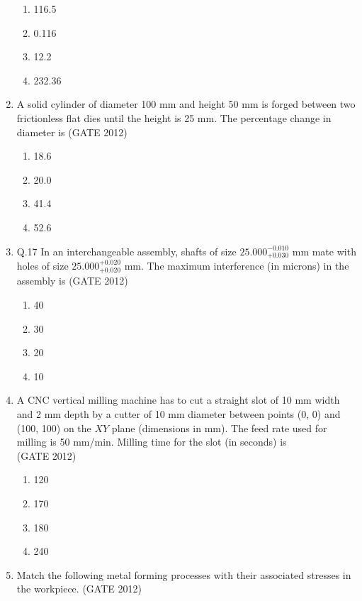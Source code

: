 \documentclass[journal,12pt,onecolumn]{IEEEtran}
\theoremstyle{remark}
\begin{document}
\begin{enumerate}
\begin{enumerate}
\item 116.5
\item 0.116
\item 12.2
\item 232.36
\end{enumerate}
\vspace{1cm}
\item  A solid cylinder of diameter 100 mm and height 50 mm is forged between two frictionless flat dies until the height is 25 mm. The percentage change in diameter is
\hfill{(GATE 2012)}

\begin{enumerate}
\item 18.6
\item 20.0
\item 41.4
\item 52.6
\end{enumerate}

\vspace{1cm}
\item Q.17 In an interchangeable assembly, shafts of size $25.000^{-0.010}_{+0.030}$ mm mate with holes of size $25.000^{+0.020}_{+0.020}$ mm. The maximum interference (in microns) in the assembly is
\hfill{(GATE 2012)}

\begin{enumerate}
\item 40
\item 30
\item 20
\item 10
\end{enumerate}

\vspace{1cm}
\item A CNC vertical milling machine has to cut a straight slot of 10 mm width and 2 mm depth by a cutter of 10 mm diameter between points (0, 0) and (100, 100) on the $XY$ plane (dimensions in mm). The feed rate used for milling is 50 mm/min. Milling time for the slot (in seconds) is\\
\hfill{(GATE 2012)}

\begin{enumerate}
\item 120
\item 170
\item 180
\item 240
\end{enumerate}

\vspace{1cm}
\item Match the following metal forming processes with their associated stresses in the workpiece.
\hfill{(GATE 2012)}


\end{enumerate}
\end{document}
